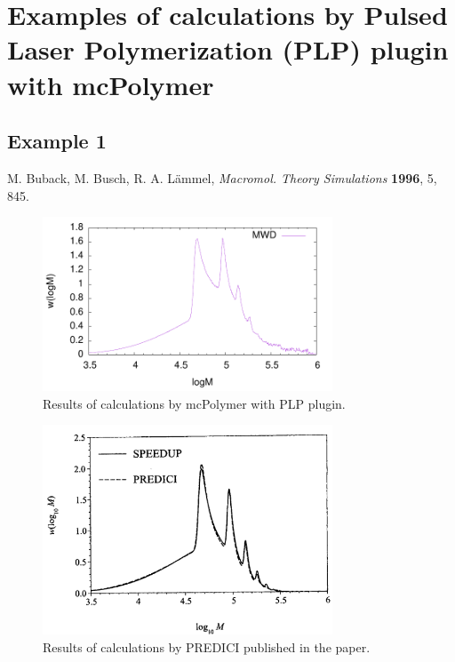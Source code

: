 \documentclass{article}
\begin{document}
\section*{Examples of calculations by Pulsed Laser Polymerization (PLP) plugin with mcPolymer}

\vspace{10mm}

\subsection*{Example 1}


M. Buback, M. Busch, R. A. Lämmel, \textit{Macromol. Theory Simulations} \textbf{1996}, 5, 845.

\begin{figure}[h]
\centering
\includegraphics[width=0.77\textwidth]{plp_example1.pdf}
\caption{Results of calculations by mcPolymer with PLP plugin.}
\end{figure}

\begin{figure}[h]
\centering
\includegraphics[width=0.77\textwidth]{Buback1996_PLP.png}
\caption{Results of calculations by PREDICI published in the paper.}
\end{figure}
\end{document}
